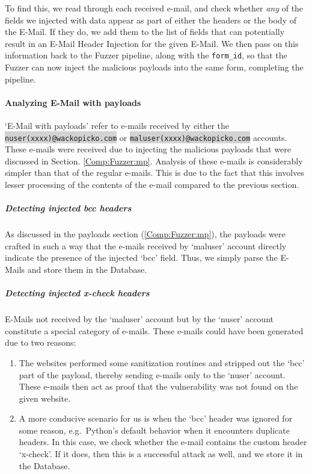 To find this, we read through each received e-mail, and check whether \emph{any} of the fields we injected with data appear as part of either the headers or the body of the E-Mail. If they do, we add them to the list of fields that can potentially result in an E-Mail Header Injection for the given E-Mail. We then pass on this information back to the Fuzzer pipeline, along with the \lstinline{form_id}, so that the Fuzzer can now inject the malicious payloads into the same form, completing the pipeline.

\paragraph{Analyzing E-Mail with payloads}
`E-Mail with payloads' refer to e-mails received by either the \colorbox{lightgray}{\lstinline{nuser(xxxx)@wackopicko.com}} or \colorbox{lightgray}{\lstinline{maluser(xxxx)@wackopicko.com}} accounts. These e-mails were received due to injecting the malicious payloads that were discussed in Section. \ref{Comp:Fuzzer:mp}. Analysis of these e-mails is considerably simpler than that of the regular e-mails. This is due to the fact that this involves lesser processing of the contents of the e-mail compared to the previous section.
\subparagraph{Detecting injected bcc headers}
As discussed in the payloads section (\ref{Comp:Fuzzer:mp}), the payloads were crafted in such a way that the e-mails received by `maluser' account directly indicate the presence of the injected `bcc' field. Thus, we simply parse the E-Mails and store them in the Database.

\label{analyze:detect_x_check}
\subparagraph{Detecting injected x-check headers}
E-Mails not received by the `maluser' account but by the `nuser' account constitute a special category of e-mails.
These e-mails could have been generated due to two reasons:
\begin{enumerate}
	\item The websites performed some sanitization routines and stripped out the `bcc' part of the payload, thereby sending e-mails only to the `nuser' account. These e-mails then act as proof that the vulnerability was not found on the given website.
	\item A more conducive scenario for us is when the `bcc' header was ignored for some reason, e.g.\ Python's default behavior when it encounters duplicate headers. In this case, we check whether the e-mail contains the custom header `x-check'. If it does, then this is a successful attack as well, and we store it in the Database.
\end{enumerate}
